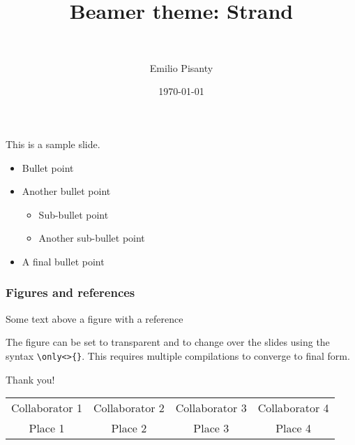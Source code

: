 \documentclass[
unknownkeysallowed
]{beamer}
\title[Footer left]{Beamer theme: Strand}
\subtitle[Footer middle]{\ }
\author{Emilio Pisanty}
\institute{\ }
\date{\today}
\begin{document}
{
\begin{frame}
\titlepage
\end{frame}
}




\begin{frame}
\frametitle{ }

This is a sample slide.

\begin{itemize}
\item
Bullet point

\pause
\item
Another bullet point
  \begin{itemize}
  \item Sub-bullet point
  \item Another sub-bullet point
  \end{itemize}

\pause
\item
A final bullet point

\end{itemize}

\end{frame}





\begin{frame}[fragile] %
\frametitle{Figures and references}
Some text above a figure with a reference\\
\begin{center}
\vspace{-2mm}
\end{center}
The figure can be set to transparent and to change over the slides using the syntax \verb|\only<>{}|. This requires multiple compilations to converge to final form.
%
\end{frame}





\newlength{\mugshotheight}
\setlength{\mugshotheight}{0.4\textheight}
\begin{frame}
\centering
{\huge Thank you!}

\vspace{15mm}

\tiny
\begin{tabular}{cccc}
Collaborator 1
&
Collaborator 2
&
Collaborator 3
&
Collaborator 4
\\
Place 1
&
Place 2
&
Place 3
&
Place 4
\end{tabular}


\end{frame}
\end{document}
